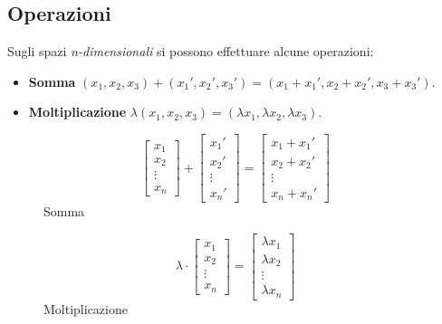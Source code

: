 \subsection{Operazioni}
Sugli spazi \emph{n-dimensionali} si possono effettuare alcune operazioni:
\begin{itemize}
    \item \textbf{Somma} $(x_1, x_2, x_3) + (x_1', x_2', x_3') = (x_1 + x_1', x_2 + x_2', x_3 + x_3')$.
    \item \textbf{Moltiplicazione} $\lambda(x_1, x_2, x_3) = (\lambda x_1, \lambda x_2, \lambda x_3)$.
\end{itemize}
\begin{figure}[h!]
    \vspace{-12pt}
    \centering
    \begin{minipage}{.3\linewidth}
    \centering
    \[
    \begin{bmatrix}x_1\\x_2\\ \vdots \\ x_n\end{bmatrix} + \begin{bmatrix}x_1'\\x_2'\\ \vdots \\ x_n'\end{bmatrix} = \begin{bmatrix}x_1 + x_1'\\x_2 + x_2'\\ \vdots \\ x_n + x_n'\end{bmatrix}
    \] 
    Somma
    \end{minipage}
    \begin{minipage}{.3\linewidth}
    \centering
    \[
    \lambda \cdot \begin{bmatrix}x_1\\x_2\\ \vdots \\ x_n\end{bmatrix} = \begin{bmatrix}\lambda x_1\\ \lambda x_2\\ \vdots \\ \lambda x_n\end{bmatrix}
    \]
    Moltiplicazione
    \end{minipage}
\end{figure}

